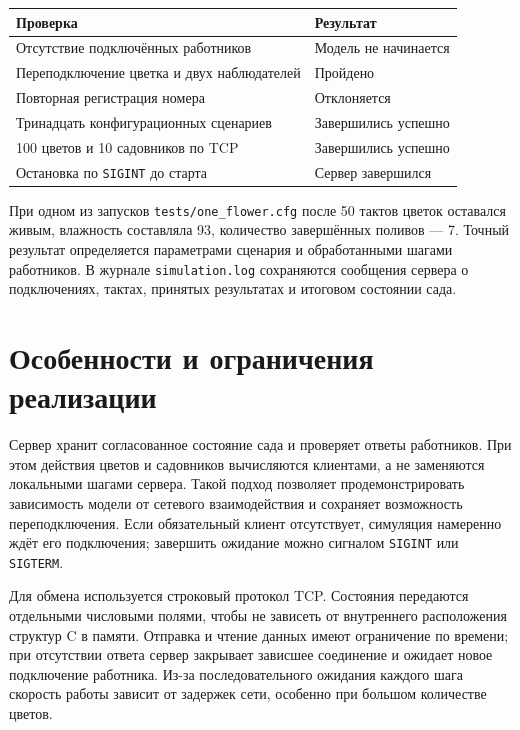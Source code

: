 \documentclass[12pt,a4paper]{article}
\begin{document}
\begin{center}
\begin{tabular}{|p{}|p{}|}
\hline
Проверка & Результат\\ \hline
Отсутствие подключённых работников & Модель не начинается\\ \hline
Переподключение цветка и двух наблюдателей & Пройдено\\ \hline
Повторная регистрация номера & Отклоняется\\ \hline
Тринадцать конфигурационных сценариев & Завершились успешно\\ \hline
100 цветов и 10 садовников по TCP & Завершились успешно\\ \hline
Остановка по \texttt{SIGINT} до старта & Сервер завершился\\ \hline
\end{tabular}
\end{center}

При одном из запусков \texttt{tests/one\_flower.cfg} после 50 тактов цветок оставался живым, влажность составляла 93, количество завершённых поливов --- 7. Точный результат определяется параметрами сценария и обработанными шагами работников. В журнале \texttt{simulation.log} сохраняются сообщения сервера о подключениях, тактах, принятых результатах и итоговом состоянии сада.

\section{Особенности и ограничения реализации}
Сервер хранит согласованное состояние сада и проверяет ответы работников. При этом действия цветов и садовников вычисляются клиентами, а не заменяются локальными шагами сервера. Такой подход позволяет продемонстрировать зависимость модели от сетевого взаимодействия и сохраняет возможность переподключения. Если обязательный клиент отсутствует, симуляция намеренно ждёт его подключения; завершить ожидание можно сигналом \texttt{SIGINT} или \texttt{SIGTERM}.

Для обмена используется строковый протокол TCP. Состояния передаются отдельными числовыми полями, чтобы не зависеть от внутреннего расположения структур C в памяти. Отправка и чтение данных имеют ограничение по времени; при отсутствии ответа сервер закрывает зависшее соединение и ожидает новое подключение работника. Из-за последовательного ожидания каждого шага скорость работы зависит от задержек сети, особенно при большом количестве цветов.
\end{document}
